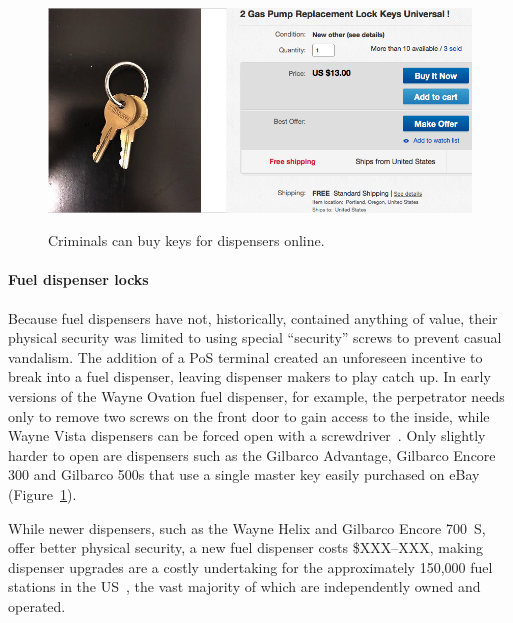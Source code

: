 \begin{figure}
    \centering
    \includegraphics[width=\linewidth]{fig/universalkey.png}\\
    \caption{Criminals can buy keys for dispensers online.}
    \label{fig:universalkey}
\end{figure}

\paragraph{Fuel dispenser locks} Because fuel dispensers have not, historically, contained anything of value, their physical security was limited to using special ``security'' screws to prevent casual vandalism. The addition of a PoS terminal created an unforeseen incentive to break into a fuel dispenser, leaving dispenser makers to play catch up. In early versions of the Wayne Ovation fuel dispenser, for example, the perpetrator needs only to remove two screws on the front door to gain access to the inside, while Wayne Vista dispensers can be forced open with a screwdriver~\cite{ny-fuel-paymentdoor-access}. Only slightly harder to open are dispensers such as the Gilbarco Advantage, Gilbarco Encore 300 and Gilbarco 500s that use a single master key easily purchased on eBay (Figure~\ref{fig:universalkey}). 

While newer dispensers, such as the Wayne Helix and Gilbarco Encore 700~S, offer better physical security, a new fuel dispenser costs \$XXX--XXX, making dispenser upgrades are a costly undertaking for the approximately 150,000 fuel
stations in the US~\cite{npn-station-count}, the vast majority of which are independently owned and operated.



